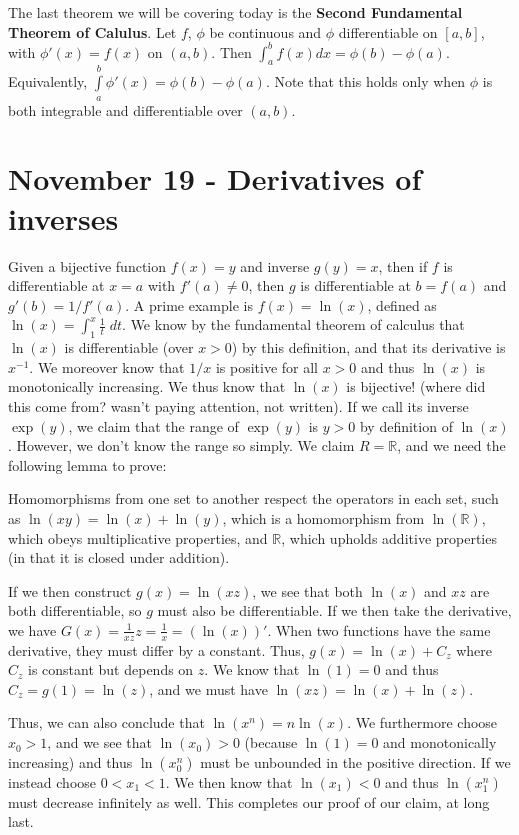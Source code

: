 \documentclass{report}
\begin{document}
The last theorem we will be covering today is the \textbf{Second Fundamental Theorem of Calulus}. Let $f$, $\phi$ be continuous and $\phi$ differentiable on $[a,b]$, with $\phi'(x) = f(x)$ on $(a,b)$. Then $\displaystyle\int_a^b f(x) dx = \phi(b) - \phi(a)$. Equivalently, $\displaystyle\int\limits_a^b \phi'(x) = \phi(b) - \phi(a)$. Note that this holds only when $\phi$ is both integrable and differentiable over $(a,b)$. 

\section{November 19 - Derivatives of inverses}

Given a bijective function $f(x) = y$ and inverse $g(y)=x$, then if $f$ is differentiable at $x=a$ with $f'(a) \neq 0$, then $g$ is differentiable at $b = f(a)$ and $g'(b) = 1/f'(a)$. A prime example is $f(x) = \ln(x)$, defined as $\ln(x) = \int_1^x\frac{1}{t}\;dt$. We know by the fundamental theorem of calculus that $\ln(x)$ is differentiable (over $x > 0$) by this definition, and that its derivative is $x^{-1}$. We moreover know that $1/x$ is positive for all $x > 0$ and thus $\ln(x)$ is monotonically increasing. We thus know that $\ln(x)$ is bijective! (where did this come from? wasn't paying attention, not written). If we call its inverse $\exp(y)$, we claim that the range of $\exp(y)$ is $y>0$ by definition of $\ln(x)$. However, we don't know the range so simply. We claim $R = \mathbb{R}$, and we need the following lemma to prove:

Homomorphisms from one set to another respect the operators in each set, such as $\ln(xy) = \ln(x) + \ln(y)$, which is a homomorphism from $\ln(\mathbb{R})$, which obeys multiplicative properties, and $\mathbb{R}$, which upholds additive properties (in that it is closed under addition).

If we then construct $g(x) = \ln(xz)$, we see that both $\ln(x)$ and $xz$ are both differentiable, so $g$ must also be differentiable. If we then take the derivative, we have $G(x) = \frac{1}{xz}z = \frac{1}{x} = (\ln(x))'$. When two functions have the same derivative, they must differ by a constant. Thus, $g(x) = \ln(x) + C_z$ where $C_z$ is constant but depends on $z$. We know that $\ln(1) = 0$ and thus $C_z = g(1) = \ln(z)$, and we must have $\ln(xz) = \ln(x) + \ln(z)$. 

Thus, we can also conclude that $\ln(x^n) = n\ln(x)$. We furthermore choose $x_0 > 1$, and we see that $\ln(x_0) > 0$ (because $\ln(1) = 0$ and monotonically increasing) and thus $\ln(x_0^n)$ must be unbounded in the positive direction. If we instead choose $0 < x_1 < 1$. We then know that $\ln(x_1) < 0$ and thus $\ln(x_1^n)$ must decrease infinitely as well. This completes our proof of our claim, at long last.
\end{document}
